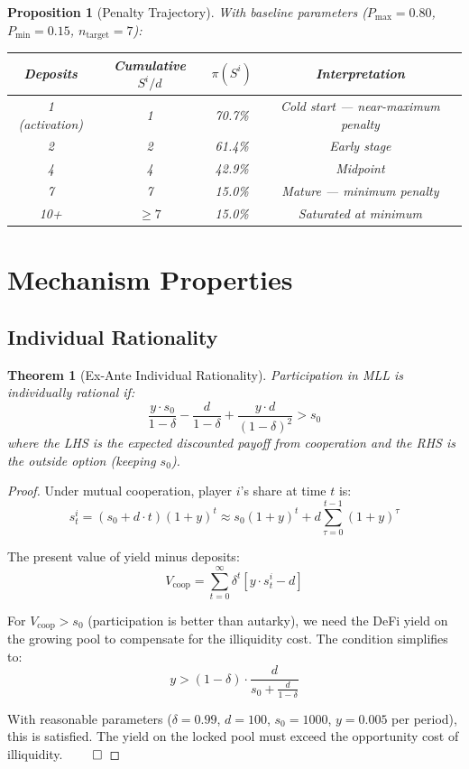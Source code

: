 \documentclass[12pt]{article}
\newtheorem{theorem}{Theorem}
\newtheorem{proposition}{Proposition}
\begin{document}
\begin{proposition}[Penalty Trajectory]
\label{prop:penalty-trajectory}
With baseline parameters ($P_{\max} = 0.80$, $P_{\min} = 0.15$, $n_{\text{target}} = 7$):

\begin{center}
\begin{tabular}{c|ccc}
Deposits & Cumulative $S^i / d$ & $\pi(S^i)$ & Interpretation \\
\hline
1 (activation) & 1 & 70.7\% & Cold start --- near-maximum penalty \\
2 & 2 & 61.4\% & Early stage \\
4 & 4 & 42.9\% & Midpoint \\
7 & 7 & 15.0\% & Mature --- minimum penalty \\
10+ & $\geq 7$ & 15.0\% & Saturated at minimum
\end{tabular}
\end{center}
\end{proposition}



\section{Mechanism Properties}

\subsection{Individual Rationality}

\begin{theorem}[Ex-Ante Individual Rationality]
\label{thm:ir}
Participation in MLL is individually rational if:
\[
\frac{y \cdot s_0}{1 - \delta} - \frac{d}{1-\delta} + \frac{y \cdot d}{(1-\delta)^2} > s_0
\]
where the LHS is the expected discounted payoff from cooperation and the RHS is the outside option (keeping $s_0$).
\end{theorem}

\begin{proof}
Under mutual cooperation, player $i$'s share at time $t$ is:
\[
s_t^i = (s_0 + d \cdot t)(1+y)^t \approx s_0(1+y)^t + d \sum_{\tau=0}^{t-1}(1+y)^\tau
\]

The present value of yield minus deposits:
\[
V_{\text{coop}} = \sum_{t=0}^{\infty} \delta^t \left[ y \cdot s_t^i - d \right]
\]

For $V_{\text{coop}} > s_0$ (participation is better than autarky), we need the DeFi yield on the growing pool to compensate for the illiquidity cost. The condition simplifies to:
\[
y > (1 - \delta) \cdot \frac{d}{s_0 + \frac{d}{1-\delta}}
\]

With reasonable parameters ($\delta = 0.99$, $d = 100$, $s_0 = 1000$, $y = 0.005$ per period), this is satisfied. The yield on the locked pool must exceed the opportunity cost of illiquidity. $\qed$
\end{proof}
\end{document}

